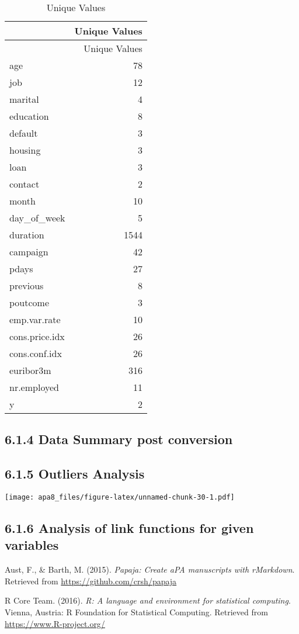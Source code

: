 \documentclass[english,floatsintext,man]{apa6}
\begin{document}
\begin{longtable}[c]{@{}lr@{}}
\caption{Unique Values}\tabularnewline
\toprule
& Unique Values\tabularnewline
\midrule
\endfirsthead
\toprule
& Unique Values\tabularnewline
\midrule
\endhead
age & 78\tabularnewline
job & 12\tabularnewline
marital & 4\tabularnewline
education & 8\tabularnewline
default & 3\tabularnewline
housing & 3\tabularnewline
loan & 3\tabularnewline
contact & 2\tabularnewline
month & 10\tabularnewline
day\_of\_week & 5\tabularnewline
duration & 1544\tabularnewline
campaign & 42\tabularnewline
pdays & 27\tabularnewline
previous & 8\tabularnewline
poutcome & 3\tabularnewline
emp.var.rate & 10\tabularnewline
cons.price.idx & 26\tabularnewline
cons.conf.idx & 26\tabularnewline
euribor3m & 316\tabularnewline
nr.employed & 11\tabularnewline
y & 2\tabularnewline
\bottomrule
\end{longtable}

\subsection{6.1.4 Data Summary post
conversion}\label{data-summary-post-conversion}

\subsection{6.1.5 Outliers Analysis}\label{outliers-analysis}

\texttt{[image: apa8\_files/figure-latex/unnamed-chunk-30-1.pdf]}

\subsection{6.1.6 Analysis of link functions for given
variables}\label{analysis-of-link-functions-for-given-variables}

\setlength{\parindent}{-0.5in} \setlength{\leftskip}{0.5in}
\setlength{\parskip}{11pt}

Aust, F., \& Barth, M. (2015). \emph{Papaja: Create aPA manuscripts with
rMarkdown}. Retrieved from \url{https://github.com/crsh/papaja}

R Core Team. (2016). \emph{R: A language and environment for statistical
computing}. Vienna, Austria: R Foundation for Statistical Computing.
Retrieved from \url{https://www.R-project.org/}
\end{document}
